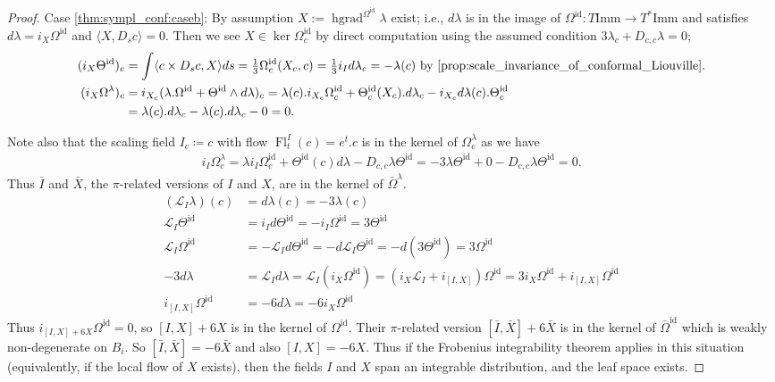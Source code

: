 \documentclass[12pt]{amsart}
\newcommand{\rev}[1]{#1}
\theoremstyle{definition}
\newcommand{\id}{\mathrm{id}}
\newcommand{\Imm}{\mathrm{Imm}}
\def\la{\lambda}
\def\Th{\Theta}
\def\Om{\Omega}
\def\x{\times}
\def\L{\mathcal{L}}
\let\on=\operatorname
\begin{document}
\begin{proof}
    Case \ref{thm:sympl_conf:caseb}: 
By assumption $X:=\on{hgrad}^{\Om^\id}\la$ exist; i.e., $d\la$ is in the image of $\Om^\id: T\Imm \to T^*\Imm$ and satisfies 
$d\la = i_{X}\Om^\id$ and $\langle X, D_sc\rangle = 0$. 
Then we see $X\in \ker \Om_c^\id$ by direct computation using the assumed condition $3\la_c+D_{c,c}\la=0$;
\begin{align}
(i_{X}\Th^\id)_c &= \int \langle c\x D_sc, X\rangle ds = \tfrac13 \Om^\id_c(X_c,c) = \tfrac13 i_I d\la_c = -\la(c)
\text{ by \ref{prop:scale_invariance_of_conformal_Liouville}.}
\\  
(i_{X}\Om^\la)_c &= i_{X_c}(\la.\Om^\id + \Th^\id \wedge d\la)_c =\la(c). i_{X_c}\Om^\id_c + \Th^\id_c(X_c).d\la_c -i_{X_c}d\la\rev{(c)}.\Th^\id_c
\\&
=\la(c).d\la_c - \la(c).d\la_c - 0 = 0. %
\end{align} 

Note also that the scaling field $I_c\coloneqq c$ with flow $\on{Fl}^I_t (c) = e^t.c$ is  in the kernel of $\Om^ \lambda_c$ as we have
\begin{align}
i_I\Om^\la_c=\la i_I \Om^\id_c +\Th^\id(c)d\la-D_{c,c}\la \Th^\id=-3\la \Th^\id +0-D_{c,c}\la\Th^\id=0.
\end{align}
Thus  $\bar I$ and $\bar X$, the $\pi$-related versions of $I$ and $X$, are in the kernel of $\bar\Om^\la$. 
\begin{align}
(\L_I\la)(c) &= d\la(c) = -3\la(c) 
\\
\L_I\Th^\id &= i_I d \Th^\id=-i_I \Om^\id=3\Th^\id
\\
\L_I\Om^\id &= -\L_I d\Th^\id  = - d\L_I \Th^\id =  -d(3 \Th^\id) = 3\Om^\id
\\
-3 d\la &= \L_I d\la = \L_I (i_X\Om^\id) = (i_X \L_I + i_{[I,X]})\Om^\id = 3 i_X\Om^\id + i_{[I,X]}\Om^\id
\\
i_{[I,X]}\Om^\id &= -6 d\la = -6 i_X\Om^\id
\end{align}
Thus $i_{[I,X]+6X}\Om^\id = 0$, so $[I,X]+6X$ is in the kernel of $\Om^\id$. Their $\pi$-related version $[\bar I,\bar X] + 6\bar X$ is in the kernel of $\bar \Om^\id$ which is weakly non-degenerate on $B_i$. So $[\bar I,\bar X]= -6\bar X$ and also $[I,X]=-6 X$.
Thus if the Frobenius integrability theorem applies in this situation (equivalently,  if the local flow of $X$ exists), then the fields $I$ and $X$ span an integrable distribution, and the leaf space exists. 


\end{proof}
\end{document}
